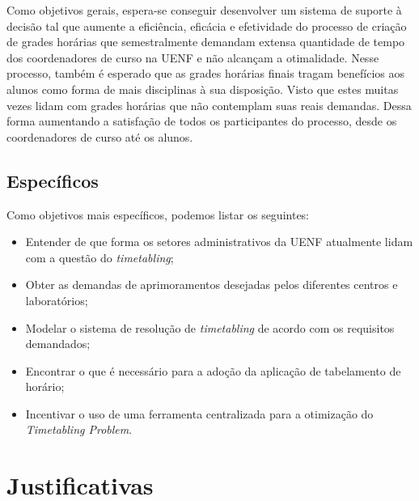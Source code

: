 Como objetivos gerais, espera-se conseguir desenvolver um sistema de suporte à decisão tal que aumente a eficiência, eficácia e efetividade do processo de criação de grades horárias que semestralmente demandam extensa quantidade de tempo dos coordenadores de curso na UENF e não alcançam a otimalidade. Nesse processo, também é esperado que as grades horárias finais tragam benefícios aos alunos como forma de mais disciplinas à sua disposição. Visto que estes muitas vezes lidam com grades horárias que não contemplam suas reais demandas. Dessa forma aumentando a satisfação de todos os participantes do processo, desde os coordenadores de curso até os alunos.

\subsection{Específicos} %

Como objetivos mais específicos, podemos listar os seguintes:

\begin{itemize}
  \item Entender de que forma os setores administrativos da UENF atualmente lidam com a questão do \textit{timetabling};
  \item Obter as demandas de aprimoramentos desejadas pelos diferentes centros e laboratórios;
  \item Modelar o sistema de resolução de \textit{timetabling} de acordo com os requisitos demandados;
  \item Encontrar o que é necessário para a adoção da aplicação de tabelamento de horário;
  \item Incentivar o uso de uma ferramenta centralizada para a otimização do \textit{Timetabling Problem}.
\end{itemize}


\section{Justificativas} %

